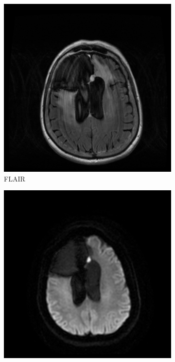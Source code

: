\begin{figure}
\begin{subfigure}[t]{\figexamplewidth}
    \centering
    \includegraphics[trim={0.5cm 0cm 0.5cm 1cm}, clip, width=\textwidth]{Figures/FLAIR}
    \caption{\gls{FLAIR}}\label{fig:FLAIR}
\end{subfigure}
\begin{subfigure}[t]{\figexamplewidth}
    \centering
    \includegraphics[trim={0.5cm 0cm 0.5cm 1cm}, clip, width=\textwidth]{Figures/DWI}

\end{subfigure}
\end{figure}
